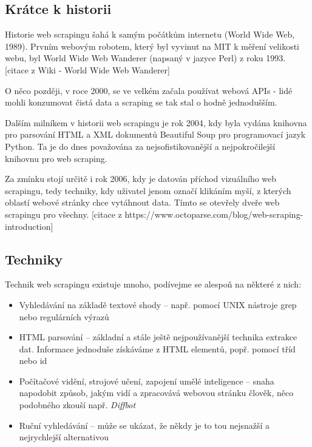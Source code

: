 \documentclass[thesis=B,czech]{FITthesis}[2012/06/26]
\begin{document}
\subsection{Krátce k historii}
Historie web scrapingu šahá k samým počátkům internetu (World Wide Web, 1989). Prvním webovým robotem, který byl vyvinut na MIT k měření velikosti webu, byl World Wide Web Wanderer (napsaný v jazyce Perl) z roku 1993. [citace z Wiki - World Wide Web Wanderer] 

O něco později, v roce 2000, se ve velkém začala používat webová APIs - lidé mohli konzumovat čistá data a scraping se tak stal o hodně jednodušším. 

Dalším milníkem v historii web scrapingu je rok 2004, kdy byla vydána knihovna pro parsování HTML a XML dokumentů Beautiful Soup pro programovací jazyk Python. Ta je do dnes považována za nejsofistikovanější a nejpokročilejší knihovnu pro web scraping.

Za zmínku stojí určitě i rok 2006, kdy je datován příchod vizuálního web scrapingu, tedy techniky, kdy uživatel jenom označí klikáním myší, z kterých oblastí webové stránky chce vytáhnout data. Tímto se otevřely dveře web scrapingu pro všechny. [citace z https://www.octoparse.com/blog/web-scraping-introduction]

\subsection{Techniky}
Technik web scrapingu existuje mnoho, podívejme se alespo\v{n} na některé z nich:
\begin{itemize}
	\item Vyhledávání na základě textové shody -- např. pomocí UNIX nástroje grep nebo regulárních výrazů
	\item HTML parsování -- základní a stále ještě nejpoužívanější technika extrakce dat. Informace jednoduše získáváme z HTML elementů, popř. pomocí tříd nebo id
	\item Počítačové vidění, strojové učení, zapojení umělé inteligence -- snaha napodobit způsob, jakým vidí a zpracovává webovou stránku člověk, něco podobného zkouší např. \emph{Diffbot}
	\item Ruční vyhledávání -- může se ukázat, že někdy je to tou nejsnažší a nejrychlejší alternativou
\end{itemize}
\end{document}
